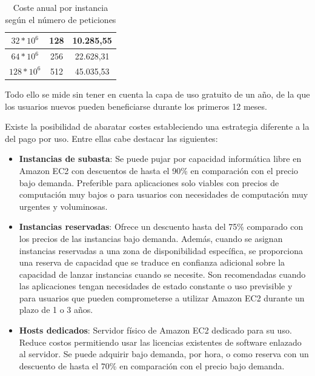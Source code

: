 \begin{table}
\begin{tabular}{ccc}
\multicolumn{1}{|c|}{$32 * 10^6$}                                      & \multicolumn{1}{c|}{128}                                                                                                       & \multicolumn{1}{c|}{10.285,55}                                                                                \\ \hline
\multicolumn{1}{|c|}{$64 * 10^6$}                                      & \multicolumn{1}{c|}{256}                                                                                                       & \multicolumn{1}{c|}{22.628,31}                                                                                \\ \hline
\multicolumn{1}{|c|}{$128 * 10^6$}                                     & \multicolumn{1}{c|}{512}                                                                                                       & \multicolumn{1}{c|}{45.035,53} \\ \hline
\end{tabular}
\caption{Coste anual por instancia según el número de peticiones}
\end{table}

Todo ello se mide sin tener en cuenta la capa de uso gratuito de un año, de la que los usuarios nuevos pueden beneficiarse durante los primeros 12 meses.

Existe la posibilidad de abaratar costes estableciendo una estrategia diferente a la del pago por uso. Entre ellas cabe destacar las siguientes:
\begin{itemize}
\item \textbf{Instancias de subasta}: Se puede pujar por capacidad informática libre en Amazon EC2 con descuentos de hasta el 90\% en comparación con el precio bajo demanda. Preferible para  aplicaciones solo viables con precios de computación muy bajos o para usuarios con necesidades de computación muy urgentes y voluminosas.
\item \textbf{Instancias reservadas}: Ofrece un descuento hasta del 75\% comparado con los precios de las instancias bajo demanda. Además, cuando se asignan instancias reservadas a una zona de disponibilidad específica, se proporciona una reserva de capacidad que se traduce en confianza adicional sobre la capacidad de lanzar instancias cuando se necesite. Son recomendadas cuando las aplicaciones tengan necesidades de estado constante o uso previsible y para usuarios que pueden comprometerse a utilizar Amazon EC2 durante un plazo de 1 o 3 años.
\item \textbf{Hosts dedicados}: Servidor físico de Amazon EC2 dedicado para su uso. Reduce costos permitiendo usar las licencias existentes de software enlazado al servidor. Se puede adquirir bajo demanda, por hora, o como reserva con un descuento de hasta el 70\% en comparación con el precio bajo demanda.
\end{itemize}

